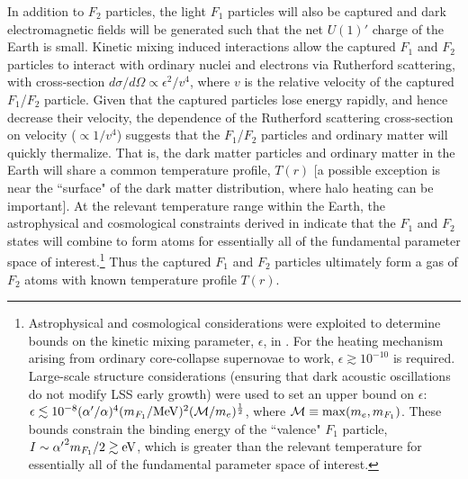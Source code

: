 \documentclass[12pt]{article}
\begin{document}
In addition to $F_2$ particles, the light $F_1$ particles will also be captured and dark electromagnetic fields will be generated such that the net $U(1)'$ charge of the Earth is small. Kinetic mixing induced interactions allow the captured $F_1$ and $F_2$ particles to interact with ordinary nuclei and electrons via Rutherford scattering, with cross-section $d\sigma/d\Omega \propto \epsilon ^2/v ^4$, where $v$ is the relative velocity of the captured $F_1$/$F_2$ particle. Given that the captured particles lose energy rapidly, and hence decrease their velocity, the dependence of the Rutherford scattering cross-section on velocity ($\propto 1/v ^4$) suggests that the $F_1$/$F_2$ particles and ordinary matter will quickly thermalize. That is, the dark matter particles and ordinary matter in the Earth will share a common temperature profile, $T(r)$ [a possible exception is near the ``surface" of the dark matter distribution, where halo heating can be important]. At the relevant temperature range within the Earth, the astrophysical and cosmological constraints derived in \cite{dhsdm} indicate that the $F_1$ and $F_2$ states will combine to form atoms for essentially all of the fundamental parameter space of interest.\footnote{Astrophysical and cosmological considerations were exploited to determine bounds on the kinetic mixing parameter, $\epsilon$, in \cite{dhsdm}. For the heating mechanism arising from ordinary core-collapse supernovae to work, $\epsilon \gtrsim 10 ^{-10}$ is required. Large-scale structure considerations (ensuring that dark acoustic oscillations do not modify LSS early growth) were used to set an upper bound on $\epsilon$: $\epsilon \lesssim 10 ^{-8}(\alpha '/\alpha) ^4(m _{F_1}/{\rm MeV}) ^2({\cal M}/m _e) ^{\frac{1}{2}}$, where ${\cal M} \equiv \max(m _e,m _{F_1})$. These bounds constrain the binding energy of the ``valence" $F_1$ particle, $I \sim {\alpha '} ^2m _{F_1}/2 \gtrsim {\rm eV}$, which is greater than the relevant temperature for essentially all of the fundamental parameter space of interest.} Thus the captured $F_1$ and $F_2$ particles ultimately form a gas of $F_2$ atoms with known temperature profile $T(r)$.
\end{document}
